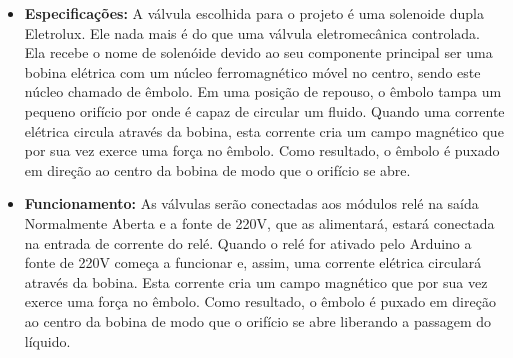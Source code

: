 \begin{itemize}
    \item \textbf{Especificações:} A válvula escolhida para o projeto é uma solenoide dupla Eletrolux. Ele nada mais é do que uma válvula eletromecânica controlada. Ela recebe o nome de solenóide devido ao seu componente principal ser uma bobina elétrica com um núcleo ferromagnético móvel no centro, sendo este núcleo chamado de êmbolo. Em uma posição de repouso, o êmbolo tampa um pequeno orifício por onde é capaz de circular um fluido. 
    Quando uma corrente elétrica circula através da bobina, esta corrente cria um campo magnético que por sua vez exerce uma força no êmbolo. Como resultado, o êmbolo é puxado em direção ao centro da bobina de modo que o orifício se abre.
    
    \item \textbf{Funcionamento:} As válvulas serão conectadas aos módulos relé na saída Normalmente Aberta e a fonte de 220V, que as alimentará, estará conectada na entrada de corrente do relé. Quando o relé for ativado pelo Arduino a fonte de 220V começa a funcionar e, assim, uma corrente elétrica circulará através da bobina. Esta corrente cria um campo magnético que por sua vez exerce uma força no êmbolo. Como resultado, o êmbolo é puxado em direção ao centro da bobina de modo que o orifício se abre liberando a passagem do líquido.
    
\end{itemize}

